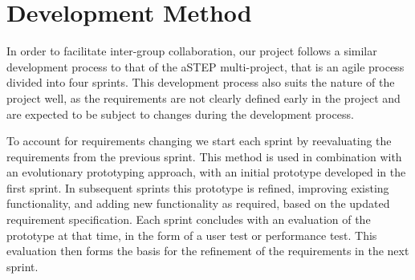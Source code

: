 \section{Development Method} \label{sec:dev_method}
In order to facilitate inter-group collaboration, our project follows a similar development process to that of the aSTEP multi-project, that is an agile process divided into four sprints. This development process also suits the nature of the project well, as the requirements are not clearly defined early in the project and are expected to be subject to changes during the development process.

To account for requirements changing we start each sprint by reevaluating the requirements from the previous sprint. This method is used in combination with an evolutionary prototyping approach, with an initial prototype developed in the first sprint. In subsequent sprints this prototype is refined, improving existing functionality, and adding new functionality as required, based on the updated requirement specification. Each sprint concludes with an evaluation of the prototype at that time, in the form of a user test or performance test. This evaluation then forms the basis for the refinement of the requirements in the next sprint. 

